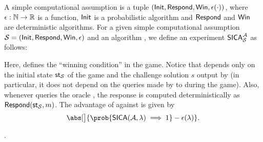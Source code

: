 \begin{definition}
  A simple computational assumption is a tuple \((\mathsf{Init},\mathsf{Respond},\mathsf{Win},\epsilon(\cdot))\),
  where \(\epsilon : \mathbb{N} \to \mathbb{R}\) is a function,
  \(\mathsf{Init}\) is a probabilistic algorithm
  and \(\mathsf{Respond}\) and \(\mathsf{Win}\) are deterministic algorithms.
  For a given simple computational assumption \(\mathcal{S} = (\mathsf{Init},\mathsf{Respond},\mathsf{Win},\epsilon)\)
  and an algorithm \advA, we define an experiment \(\mathsf{SICA}_{\mathcal{S}}^{\mathcal{A}}\) as follows:

  \begin{pchstack}[center,space=0.5cm]
  \end{pchstack}

  Here, \Win{} defines the ``winning condition'' in the game.
  Notice that \Win{} depends only on the initial state \(\mathsf{st}_{\mathcal{S}}\)
  of the game and the challenge solution \(s\) output by \advA
  (in particular, it does not depend on the queries made by \advA
  to \oracle during the game).
  Also, whenever \advA queries the oracle \oracle,
  the response is computed deterministically as \(\mathsf{Respond}(\mathsf{st}_{\mathcal{S}},m)\).
  The advantage of \advA{} against \Simple is given by
  \begin{equation}
    \abs[\big]{\prob{\SICA(\advA,\lambda) \implies 1} - \epsilon(\lambda)}.
  \end{equation}
\end{definition}

.


